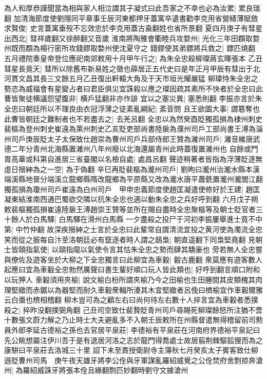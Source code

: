 為人和厚恭謹聞當為相與家人相泣謂其子凝式曰此吾家之不幸也必為汝累|{
	累良瑞翻}
加清海節度使劉隱同平章事壬辰河東都押牙蓋寓卒遺書勸李克用省營繕薄賦斂求賢俊|{
	史言蓋寓垂歿不忘效忠於李克用蓋古盍翻姓也省所景翻}
夏四月庚子有彗星出西北|{
	彗祥歲翻又徐醉翻又音歲}
淮南將陶雅會衢睦兵攻婺州|{
	光化三年田頵取婺州既而頵為楊行密所攻錢鏐取婺州使沈夏守之}
錢鏐使其弟鏢將兵救之|{
	鏢匹燒翻}
五月禮院奏皇帝登位應祀南郊敕用十月甲午行之|{
	為朱全忠殺柳璨蔣玄暉張本}
乙丑彗星長竟天|{
	彗所以除舊布新易姓之徵也薛居正五代史曰是年正月甲辰有彗出于北河貫文昌其長三文餘五月乙丑復出軒轅大角及于天市垣光耀嚴猛}
柳璨恃朱全忠之勢恣為威福會有星變占者曰君臣俱災宜誅殺以應之璨因疏其素所不快者於全忠曰此曹皆聚徒横議怨望腹非|{
	横戶猛翻非亦作誹}
宜以之塞災異|{
	塞悉則翻}
李振亦言於朱全忠曰朝廷所以不理良由衣冠浮薄之徒紊亂綱紀|{
	紊音問}
且王欲圖大事|{
	謂簒奪也}
此曹皆朝廷之難制者也不若盡去之|{
	去羌呂翻}
全忠以為然癸酉貶獨孤損為棣州刺史裴樞為登州刺史崔遠為萊州刺史乙亥貶吏部尚書陸扆為濮州司戶工部尚書王溥為淄州司戶庚辰貶太子太保致仕趙崇為曹州司戶兵部侍郎王贊為濰州司戶|{
	濰音維唐武德二年分青州北海縣置濰州八年州廢以北海還屬青州此時蓋復置濰州也}
自餘或門胄高華或科第自進居三省臺閣以名檢自處|{
	處昌呂翻}
聲迹稍著者皆指為浮薄貶逐無虛日搢紳為之一空|{
	為于偽翻}
辛巳再貶裴樞為瀧州司戶|{
	劉昫曰瀧州治瀧水縣本漢端溪縣地晉分端溪立龍鄉縣隋改龍鄉為平原縣又改為瀧水唐平蕭銑置瀧州瀧閭江翻}
獨孤損為瓊州司戶崔遠為白州司戶　甲申忠義節度使趙匡凝遣使修好於王建|{
	趙匡凝東結淮南西通巴蜀欲交隣以抗朱全忠也適以動朱全忠之兵好呼到翻}
六月戊子朔敕裴樞獨孤損崔遠陸扆王溥趙崇王贊等並所在賜自盡時全忠聚樞等及朝士貶官者三十餘人於白馬驛|{
	白馬驛在滑州白馬縣}
一夕盡殺之投尸于河初李振屢舉進士竟不中第|{
	中竹仲翻}
故深疾搢紳之士言於全忠曰此輩常自謂清流宜投之黄河使為濁流全忠笑而從之振每自汴至洛朝廷必有竄逐者時人謂之鴟梟|{
	朝直遥翻下同梟堅堯翻}
見朝士皆頤指氣使|{
	以頤指麾以氣使令言其怙朱全忠之勢而肆其驕豪也}
旁若無人全忠嘗與僚佐及遊客坐於大柳之下全忠獨言曰此柳宜為車轂|{
	轂古鹿翻}
衆莫應有遊客數人起應曰宜為車轂全忠勃然厲聲曰書生輩好順口玩人皆此類也|{
	好呼到翻言順口附和以玩狎人}
車轂須用夾榆|{
	說文榆白枌所謂夾榆乃今之田榆也生田塍間其皮類槐其肉理堅緻而赤鋸以為器堅而耐久車轂衆輻所湊其木宜堅緻者呂俛曰櫅榆宜作車轂爾雅云白棗也櫅相稽翻}
柳木豈可為之顧左右曰尚何待左右數十人捽言宜為車轂者悉撲殺之|{
	捽昨没翻撲弼角翻}
己丑司空致仕裴贄貶青州司戶尋賜死柳璨餘怒所注猶不啻十數張文蔚力解之乃止時士大夫避亂多不入朝壬辰敕所在州縣督遣無得稽留前司勲員外郎李延古德裕之孫也去官居平泉莊|{
	李德裕有平泉莊在河南府界德裕平泉記曰先公眺想屬注伊川吾于是有退居河洛之志於龍門得喬處士故居翦荆棘驅狐狸而為之康駢曰平泉莊去洛城三十里}
詔下未至責授衛尉寺主簿秋七月癸亥太子賓客致仕柳遜貶曹州司馬　庚午夜天雄牙將李公佺與牙軍謀亂羅紹威覺之公佺焚府舍剽掠奔滄州|{
	為羅紹威誅牙將張本佺且緣翻剽匹妙翻時劉守文據滄州}
